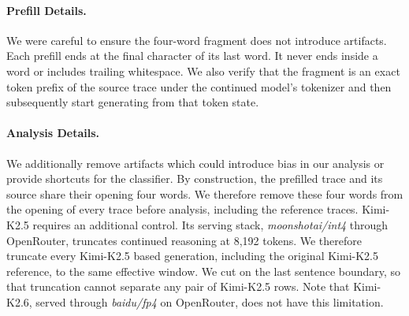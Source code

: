 
\paragraph{Prefill Details.} We were careful to ensure the four-word fragment does not introduce artifacts. Each prefill ends at the final character of its last word. It never ends inside a word or includes trailing whitespace. We also verify that the fragment is an exact token prefix of the source trace under the continued model's tokenizer and then subsequently start generating from that token state.

\paragraph{Analysis Details.} We additionally remove artifacts which could introduce bias in our analysis or provide shortcuts for the classifier. By construction, the prefilled trace and its source share their opening four words. We therefore remove these four words from the opening of every trace before analysis, including the reference traces.
Kimi-K2.5 requires an additional control. Its serving stack, \textit{moonshotai/int4} through OpenRouter, truncates continued reasoning at 8{,}192 tokens. We therefore truncate every Kimi-K2.5 based generation, including the original Kimi-K2.5 reference, to the same effective window. We cut on the last sentence boundary, so that truncation cannot separate any pair of Kimi-K2.5 rows. Note that Kimi-K2.6, served through \textit{baidu/fp4} on OpenRouter, does not have this limitation.

